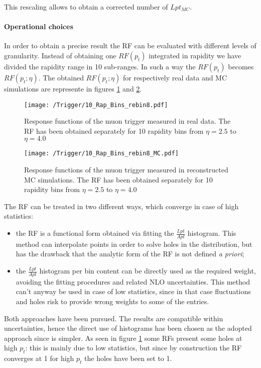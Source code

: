 This rescaling allows to obtain a corrected number of $Lpt_{MC}$.

\paragraph{Operational choices}
In order to obtain a precise result the RF can be evaluated with different levels of granularity. Instead of obtaining one $RF(p_t)$ integrated in rapidity we have divided the rapidity range in 10 sub-ranges. In such a way the $RF(p_t)$ becomes $RF(p_t; \eta)$. The obtained $RF(p_t; \eta)$ for respectively real data and MC simulations are represente in figures \ref{fig:RFRapidityData} and \ref{fig:RFRapidityMC}.

\begin{figure}[!h]
\begin{center}
  \texttt{[image: /Trigger/10\_Rap\_Bins\_rebin8.pdf]}
\end{center} 
\caption{\label{fig:RFRapidityData} Response functions of the muon trigger measured in real data. The RF has been obtained separately for 10 rapidity bins from $\eta=2.5$ to $\eta=4.0$}
\end{figure}  

\begin{figure}[!h]
\begin{center}
  \texttt{[image: /Trigger/10\_Rap\_Bins\_rebin8\_MC.pdf]}
\end{center} 
\caption{\label{fig:RFRapidityMC} Response functions of the muon trigger measured in reconstructed MC simulations. The RF has been obtained separately for 10 rapidity bins from $\eta=2.5$ to $\eta=4.0$}
\end{figure} 

The RF can be treated in two different ways, which converge in case of high statistics:
\begin{itemize}
	\item the RF is a functional form obtained via fitting the $\frac{Lpt}{Apt}$ histogram. This method can interpolate points in order to solve holes in the distribution, but has the drawback that the analytic form of the RF is not defined \textit{a priori};
	\item the $\frac{Lpt}{Apt}$ histogram per bin content can be directly used as the required weight, avoiding the fitting procedures and related NLO uncertainties. This method can't anyway be used in case of low statistics, since in that case fluctuations and holes risk to provide wrong weights to some of the entries.
\end{itemize} 
Both approaches have been pursued. The results are compatible within uncertainties, hence the direct use of histograms has been chosen as the adopted approach since is simpler. As seen in figure \ref{fig:RFRapidityData} some RFs present some holes at high $p_t$: this is mainly due to low statistics, but since by construction the RF converges at 1 for high $p_t$ the holes have been set to 1.

